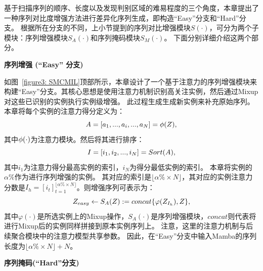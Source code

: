 基于扫描序列的顺序、长度以及发现判别区域的难易程度的三个角度，本章提出了一种序列对比度增强方法进行差异化序列生成，即构造“Easy”分支和“Hard”分支。
根据所在分支的不同，上小节提到的序列对比增强模块$S(\cdot)$，可分为两个子模块：序列增强模块$S_A(\cdot)$和序列掩码模块$S_M(\cdot)$。
下面分别详细介绍这两个部分。

\textbf{序列增强 (“Easy” 分支)} 

如图~\ref{figure3: SMCMIL}顶部所示，本章设计了一个基于注意力的序列增强模块来构建“Easy”分支。其核心思想是使用注意力机制识别高关注实例，然后通过Mixup对这些已识别的实例执行实例级增强。
此过程生成生成新实例来补充原始序列。本章将每个实例的注意力得分定义为：
\begin{equation}
  \mathnormal{A}=[a_1,...,a_i,...,a_N]=\mathnormal{\phi}(\mathnormal{Z}),
  \label{eq8}
  \end{equation}
其中$\mathnormal{\phi}(\cdot)$为注意力模块。然后将其进行排序：
\begin{equation}
  \mathnormal{I}=[i_1,i_2,...,i_N]=Sort(\mathnormal{A}),
  \label{eq9}
  \end{equation}
其中$i_1$为注意力得分最高实例的索引，$i_N$为得分最低实例的索引。
本章将实例的$\alpha\%$作为进行序列增强的实例。
其对应的索引是$\lfloor \alpha\% \times N \rfloor$，其对应的实例注意力分数是$I_h=[i_t]^{\lfloor \alpha\% \times N \rfloor}_{t=1}$。则增强序列可表示为：
\begin{equation}
  \mathnormal{Z_{easy}}\leftarrow S_A(Z):=concat\{\varphi(Z_{\mathnormal{I}_h}),Z\},
  \label{eq10}
  \end{equation}
其中$\varphi(\cdot)$是所选实例上的Mixup操作，$S_A(\cdot)$是序列增强模块，$concat$则代表将进行Mixup后的实例同样拼接到原本实例序列上。
注意，这里的注意力机制与后续聚合模块中的注意力模型共享参数。
因此，在“Easy”分支中输入Mamba的序列长度为$\lfloor \alpha\% \times N \rfloor + N$。

\textbf{序列掩码(“Hard”分支)} 

